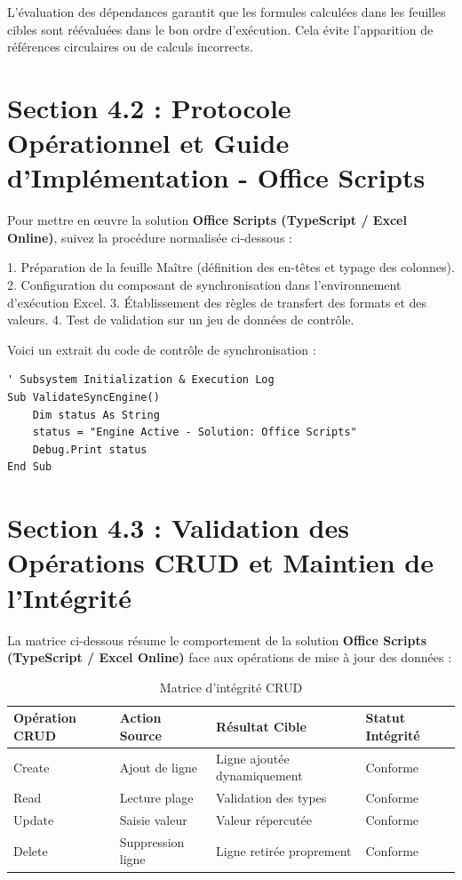 \documentclass[12pt,a4paper]{report}
\begin{document}
L'évaluation des dépendances garantit que les formules calculées dans les feuilles cibles sont réévaluées dans le bon ordre d'exécution. Cela évite l'apparition de références circulaires ou de calculs incorrects.


\section{Section 4.2 : Protocole Opérationnel et Guide d'Implémentation - Office Scripts}
Pour mettre en œuvre la solution \textbf{Office Scripts (TypeScript / Excel Online)}, suivez la procédure normalisée ci-dessous :

1. Préparation de la feuille Maître (définition des en-têtes et typage des colonnes).
2. Configuration du composant de synchronisation dans l'environnement d'exécution Excel.
3. Établissement des règles de transfert des formats et des valeurs.
4. Test de validation sur un jeu de données de contrôle.

Voici un extrait du code de contrôle de synchronisation :
\begin{lstlisting}[caption=Code de controle operationnel]
' Subsystem Initialization & Execution Log
Sub ValidateSyncEngine()
    Dim status As String
    status = "Engine Active - Solution: Office Scripts"
    Debug.Print status
End Sub
\end{lstlisting}


\section{Section 4.3 : Validation des Opérations CRUD et Maintien de l'Intégrité}
La matrice ci-dessous résume le comportement de la solution \textbf{Office Scripts (TypeScript / Excel Online)} face aux opérations de mise à jour des données :

\begin{table}[h]
\centering
\begin{tabular}{@{}llll@{}}
\toprule
\textbf{Opération CRUD} & \textbf{Action Source} & \textbf{Résultat Cible} & \textbf{Statut Intégrité} \\ \midrule
Create & Ajout de ligne & Ligne ajoutée dynamiquement & Conforme \\
Read & Lecture plage & Validation des types & Conforme \\
Update & Saisie valeur & Valeur répercutée & Conforme \\
Delete & Suppression ligne & Ligne retirée proprement & Conforme \\ \bottomrule
\end{tabular}
\caption{Matrice d'intégrité CRUD}
\end{table}
\end{document}
